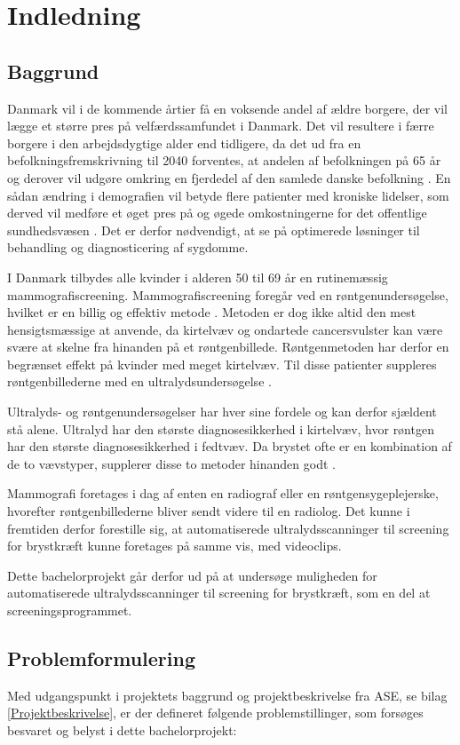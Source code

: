 \chapter{Indledning}
\section{Baggrund}
Danmark vil i de kommende årtier få en voksende andel af ældre borgere, der vil lægge et større pres på velfærdssamfundet i Danmark. Det vil resultere i færre borgere i den arbejdsdygtige alder end tidligere, da det ud fra en befolkningsfremskrivning til 2040 forventes, at andelen af befolkningen på 65 år og derover vil udgøre omkring en fjerdedel af den samlede danske befolkning \cite{Befolk}. En sådan ændring i demografien vil betyde flere patienter med kroniske lidelser, som derved vil medføre et øget pres på og øgede omkostningerne for det offentlige sundhedsvæsen \cite{Pres}. Det er derfor nødvendigt, at se på optimerede løsninger til behandling og diagnosticering af sygdomme. 

I Danmark tilbydes alle kvinder i alderen 50 til 69 år en rutinemæssig mammografiscreening. Mammografiscreening foregår ved en røntgenundersøgelse, hvilket er en billig og effektiv metode \cite{Afsloring}. Metoden er dog ikke altid den mest hensigtsmæssige at anvende, da kirtelvæv og ondartede cancersvulster kan være svære at skelne fra hinanden på et røntgenbillede. Røntgenmetoden har derfor en begrænset effekt på kvinder med meget kirtelvæv. Til disse patienter suppleres røntgenbillederne med en ultralydsundersøgelse \cite{Ultralyd}.

Ultralyds- og røntgenundersøgelser har hver sine fordele og kan derfor sjældent stå alene. Ultralyd har den største diagnosesikkerhed i kirtelvæv, hvor røntgen har den største diagnosesikkerhed i fedtvæv. Da brystet ofte er en kombination af de to vævstyper, supplerer disse to metoder hinanden godt \cite{Ultralyd}. 

Mammografi foretages i dag af enten en radiograf eller en røntgensygeplejerske, hvorefter røntgenbillederne bliver sendt videre til en radiolog. Det kunne i fremtiden derfor forestille sig, at automatiserede ultralydsscanninger til screening for brystkræft kunne foretages på samme vis, med videoclips.

Dette bachelorprojekt går derfor ud på at undersøge muligheden for automatiserede ultralydsscanninger til screening for brystkræft, som en del at screeningsprogrammet.

\section{Problemformulering}
Med udgangspunkt i projektets baggrund og projektbeskrivelse fra ASE, se bilag \ref{Projektbeskrivelse}, er der defineret følgende problemstillinger, som forsøges besvaret og belyst i dette bachelorprojekt:

